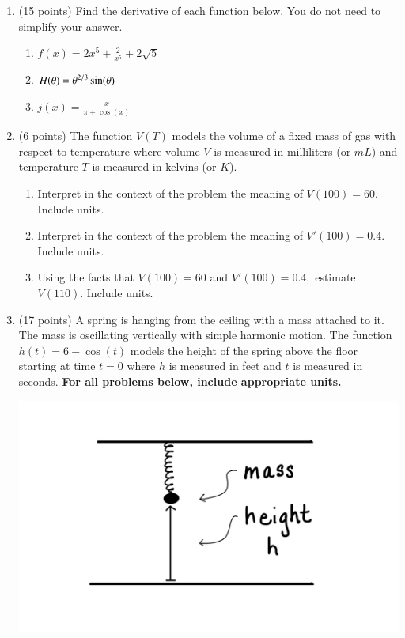 \documentclass[12pt]{article}
\renewcommand{\emph}[1]{\textsf{\textbf{#1}}}
\begin{document}
\begin{enumerate}
\newpage

\item (15 points) Find the derivative of each function below. You do not need to simplify your answer. 
	\begin{enumerate}
	\item $f(x)=2x^{5}+\frac{2}{x^5}+2\sqrt{5}$
	\vfill
	\item $H(\theta)= \theta^{\small{2/3}} \sin(\theta)$
	\vfill
	\item $j(x)=\frac{x}{\pi+\cos(x)}$
	\vfill
	\end{enumerate}
	
\item (6 points) The function $V(T)$ models the volume of a fixed mass of gas with respect to temperature where volume $V$ is measured in milliliters (or $mL$) and temperature $T$ is measured in kelvins (or $K$).
	\begin{enumerate}
	\item Interpret in the context of the problem the meaning of $V(100)=60.$ Include units.
	\vfill
	\item Interpret in the context of the problem the meaning of $V'(100)=0.4.$ Include units.
	\vfill
	\item Using the facts that $V(100)=60$ and $V'(100)=0.4,$ estimate $V(110).$ Include units.
	\vfill
	\end{enumerate}
\newpage
\item (17 points) A spring is hanging from the ceiling with a mass attached to it. The mass is oscillating vertically with simple harmonic motion. The function $h(t)= 6-\cos(t)$ models the height of the spring above the floor starting at time $t=0$ where $h$ is measured in feet and $t$ is measured in seconds.
\emph{For all problems below, include appropriate units.}

\includegraphics[scale=0.2]{spring.jpeg}


\end{enumerate}
\end{document}
